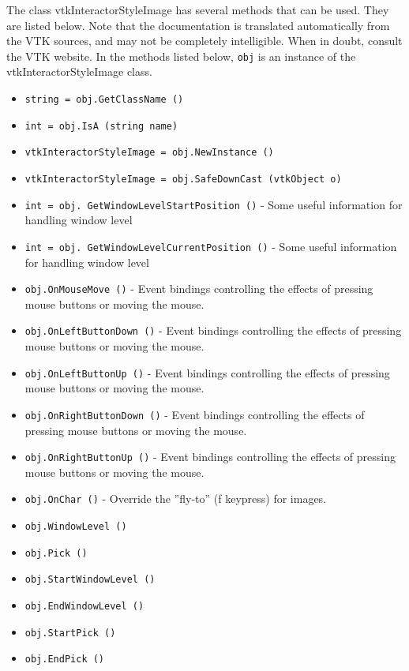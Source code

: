 The class vtkInteractorStyleImage has several methods that can be used.
  They are listed below.
Note that the documentation is translated automatically from the VTK sources,
and may not be completely intelligible.  When in doubt, consult the VTK website.
In the methods listed below, \verb|obj| is an instance of the vtkInteractorStyleImage class.
\begin{itemize}
\item  \verb|string = obj.GetClassName ()|

\item  \verb|int = obj.IsA (string name)|

\item  \verb|vtkInteractorStyleImage = obj.NewInstance ()|

\item  \verb|vtkInteractorStyleImage = obj.SafeDownCast (vtkObject o)|

\item  \verb|int = obj. GetWindowLevelStartPosition ()| -  Some useful information for handling window level

\item  \verb|int = obj. GetWindowLevelCurrentPosition ()| -  Some useful information for handling window level

\item  \verb|obj.OnMouseMove ()| -  Event bindings controlling the effects of pressing mouse buttons
 or moving the mouse.

\item  \verb|obj.OnLeftButtonDown ()| -  Event bindings controlling the effects of pressing mouse buttons
 or moving the mouse.

\item  \verb|obj.OnLeftButtonUp ()| -  Event bindings controlling the effects of pressing mouse buttons
 or moving the mouse.

\item  \verb|obj.OnRightButtonDown ()| -  Event bindings controlling the effects of pressing mouse buttons
 or moving the mouse.

\item  \verb|obj.OnRightButtonUp ()| -  Event bindings controlling the effects of pressing mouse buttons
 or moving the mouse.

\item  \verb|obj.OnChar ()| -  Override the ''fly-to'' (f keypress) for images.

\item  \verb|obj.WindowLevel ()|

\item  \verb|obj.Pick ()|

\item  \verb|obj.StartWindowLevel ()|

\item  \verb|obj.EndWindowLevel ()|

\item  \verb|obj.StartPick ()|

\item  \verb|obj.EndPick ()|

\end{itemize}
